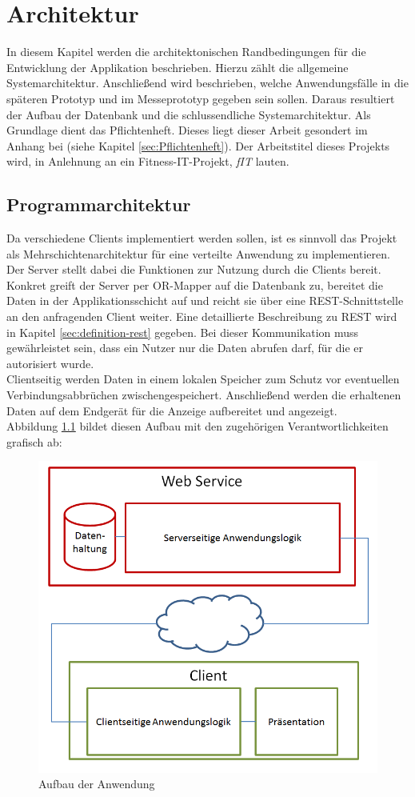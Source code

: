 \chapter{Architektur}
\label{cha:architektur}
In diesem Kapitel werden die architektonischen Randbedingungen für die Entwicklung der Applikation beschrieben. Hierzu zählt die allgemeine Systemarchitektur. Anschließend wird beschrieben, welche Anwendungsfälle in die späteren Prototyp und im Messeprototyp gegeben sein sollen. Daraus resultiert der Aufbau der Datenbank und die schlussendliche Systemarchitektur. Als Grundlage dient das Pflichtenheft. Dieses liegt dieser Arbeit gesondert im Anhang bei (siehe Kapitel \ref{sec:Pflichtenheft}). Der Arbeitstitel dieses Projekts wird, in Anlehnung an ein Fitness-IT-Projekt, \textit{fIT} lauten. 

\section{Programmarchitektur}
\label{sec:programmarchitektur}
Da verschiedene Clients implementiert werden sollen, ist es sinnvoll das Projekt als Mehrschichtenarchitektur für eine verteilte Anwendung zu implementieren. \\
Der Server stellt dabei die Funktionen zur Nutzung durch die Clients bereit. Konkret greift der Server per \gls{OR-Mapper} auf die Datenbank zu, bereitet die Daten in der Applikationsschicht auf und reicht sie über eine \ac{REST}-Schnittstelle an den anfragenden Client weiter. Eine detaillierte Beschreibung zu \ac{REST} wird in Kapitel \ref{sec:definition-rest} gegeben. Bei dieser Kommunikation muss gewährleistet sein, dass ein Nutzer nur die Daten abrufen darf, für die er autorisiert wurde. \\
Clientseitig werden Daten in einem lokalen Speicher zum Schutz vor eventuellen Verbindungsabbrüchen zwischengespeichert. Anschließend werden die erhaltenen Daten auf dem Endgerät für die Anzeige aufbereitet und angezeigt. \\
Abbildung \ref{pic:architecture} bildet diesen Aufbau mit den zugehörigen Verantwortlichkeiten grafisch ab:
\begin{figure}[h]
\centering
\includegraphics[width=0.7\linewidth]{content/images/Aufbau-Architektur.png}
\caption{Aufbau der Anwendung}
\label{pic:architecture}
\end{figure}

